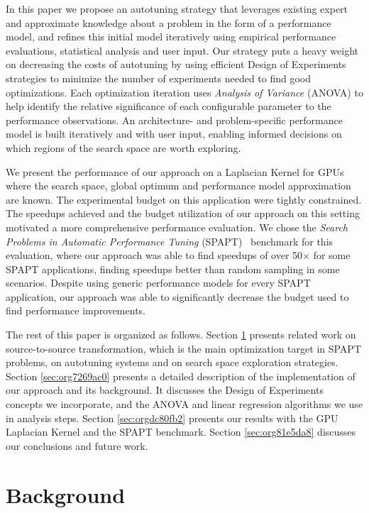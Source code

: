 \documentclass[conference]{IEEEtran}
\begin{document}
In this paper we propose an autotuning strategy that leverages existing expert
and approximate knowledge about a problem in the form of a performance model,
and refines this initial model iteratively using empirical performance
evaluations, statistical analysis and user input. Our strategy puts a heavy
weight on decreasing the costs of autotuning by using efficient Design of
Experiments strategies to minimize the number of experiments needed to find good
optimizations. Each optimization iteration uses \emph{Analysis of Variance} (ANOVA)
to help identify the relative significance of each configurable parameter to the
performance observations. An architecture- and problem-specific performance
model is built iteratively and with user input, enabling informed decisions on
which regions of the search space are worth exploring.

We present the performance of our approach on a Laplacian Kernel for GPUs where
the search space, global optimum and performance model approximation are known.
The experimental budget on this application were tightly constrained. The
speedups achieved and the budget utilization of our approach on this setting
motivated a more comprehensive performance evaluation. We chose the \emph{Search
Problems in Automatic Performance Tuning}
(SPAPT)~\cite{balaprakash2012spapt} benchmark for this evaluation, where
our approach was able to find speedups of over 50\(\times\) for some SPAPT
applications, finding speedups better than random sampling in some scenarios.
Despite using generic performance models for every SPAPT application, our
approach was able to significantly decrease the budget used to find performance
improvements.

The rest of this paper is organized as follows. Section \ref{sec:org278d6e7} presents
related work on source-to-source transformation, which is the main optimization
target in SPAPT problems, on autotuning systems and on search space exploration
strategies. Section \ref{sec:org7269ac0} presents a
detailed description of the implementation of our approach and its background.
It discusses the Design of Experiments concepts we incorporate, and the ANOVA
and linear regression algorithms we use in analysis steps. Section \ref{sec:orgdc80fb2} presents our results with the GPU Laplacian Kernel and the SPAPT
benchmark. Section \ref{sec:org81e5da8} discusses our conclusions and future work.
\section{Background}
\label{sec:org278d6e7}
\end{document}
